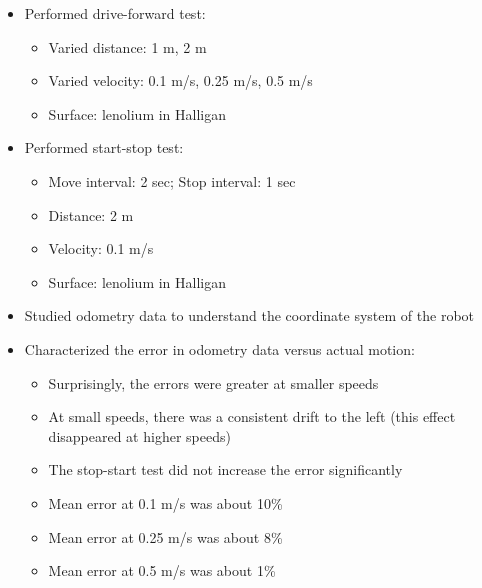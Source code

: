 \documentclass[12pt]{article}
\begin{document}
\begin{itemize}
    \setlength{\itemsep}{0pt}
    \setlength{\parskip}{0pt}
    \setlength{\parsep}{0pt}
    \item Performed drive-forward test:
        \begin{itemize}
            \setlength{\itemsep}{0pt}
            \setlength{\parskip}{0pt}
            \setlength{\parsep}{0pt}
            \item Varied distance: 1 m, 2 m
            \item Varied velocity: 0.1 m/s, 0.25 m/s, 0.5 m/s
            \item Surface: lenolium in Halligan
        \end{itemize}
    \item Performed start-stop test:
        \begin{itemize}
            \setlength{\itemsep}{0pt}
            \setlength{\parskip}{0pt}
            \setlength{\parsep}{0pt}
            \item Move interval: 2 sec; Stop interval: 1 sec
            \item Distance: 2 m
            \item Velocity: 0.1 m/s
            \item Surface: lenolium in Halligan
        \end{itemize}
    \item Studied odometry data to understand the coordinate system of the
          robot
    \item Characterized the error in odometry data versus actual motion:
        \begin{itemize}
            \setlength{\itemsep}{0pt}
            \setlength{\parskip}{0pt}
            \setlength{\parsep}{0pt}
            \item Surprisingly, the errors were greater at smaller speeds
            \item At small speeds, there was a consistent drift to the left
                  (this effect disappeared at higher speeds)
            \item The stop-start test did not increase the error significantly
            \item Mean error at 0.1 m/s was about 10\%
            \item Mean error at 0.25 m/s was about 8\%
            \item Mean error at 0.5 m/s was about 1\%
        \end{itemize}
\end{itemize}
\end{document}
